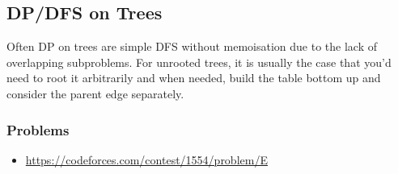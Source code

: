 \subsection*{DP/DFS on Trees}
Often DP on trees are simple DFS without memoisation due to the lack of overlapping subproblems. For unrooted trees, it is usually the case that you'd need to root it arbitrarily and when needed, build the table bottom up and consider the parent edge separately.

\subsubsection*{Problems}
\begin{itemize}
\item  \url{https://codeforces.com/contest/1554/problem/E}
\end{itemize}